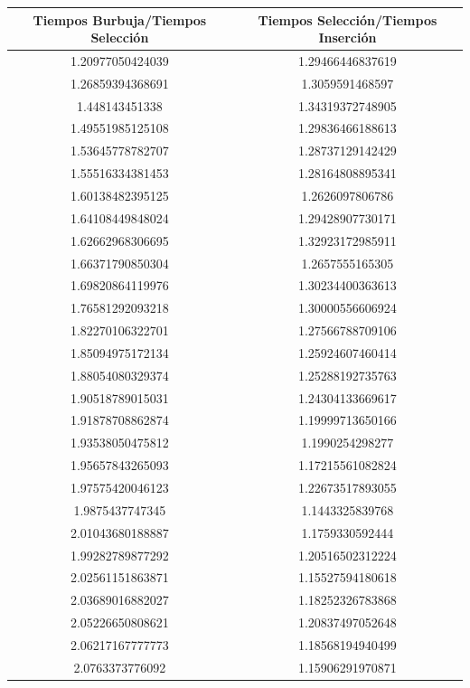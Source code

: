 \documentclass{article}
\begin{document}
\begin{longtable}{|c||c|}
	\hline
	Tiempos Burbuja/Tiempos Selección & Tiempos Selección/Tiempos Inserción \\ \hline
	1.20977050424039	&  1.29466446837619 \\ \hline
	1.26859394368691	&  1.3059591468597 \\ \hline
	1.448143451338	    &  1.34319372748905 \\ \hline
	1.49551985125108	&  1.29836466188613 \\ \hline
	1.53645778782707	&  1.28737129142429 \\ \hline
	1.55516334381453	&  1.28164808895341 \\ \hline
	1.60138482395125	&  1.2626097806786 \\ \hline
	1.64108449848024	&  1.29428907730171 \\ \hline
	1.62662968306695	&  1.32923172985911 \\ \hline
	1.66371790850304	&  1.2657555165305 \\ \hline
	1.69820864119976	&  1.30234400363613 \\ \hline
	1.76581292093218	&  1.30000556606924 \\ \hline
	1.82270106322701	&  1.27566788709106 \\ \hline
	1.85094975172134	&  1.25924607460414 \\ \hline
	1.88054080329374	&  1.25288192735763 \\ \hline
	1.90518789015031	&  1.24304133669617 \\ \hline
	1.91878708862874	&  1.19999713650166 \\ \hline
	1.93538050475812	&  1.1990254298277 \\ \hline
	1.95657843265093	&  1.17215561082824 \\ \hline
	1.97575420046123	&  1.22673517893055 \\ \hline
	1.9875437747345	    &  1.1443325839768 \\ \hline
	2.01043680188887	&  1.1759330592444 \\ \hline
	1.99282789877292	&  1.20516502312224 \\ \hline
	2.02561151863871	&  1.15527594180618 \\ \hline
	2.03689016882027	&  1.18252326783868 \\ \hline
	2.05226650808621	&  1.20837497052648 \\ \hline
	2.06217167777773	&  1.18568194940499 \\ \hline
	2.0763373776092	    &  1.15906291970871 \\ \hline

\end{longtable}
\end{document}
